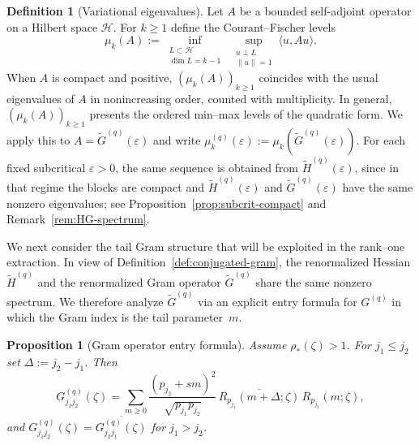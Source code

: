 \documentclass[11pt]{amsart}
\numberwithin{equation}{section}
\theoremstyle{plain}
\newtheorem{proposition}[theorem]{Proposition}
\theoremstyle{definition}
\newtheorem{definition}[theorem]{Definition}
\theoremstyle{remark}
\begin{document}
\begin{definition}[Variational eigenvalues]\label{def:variational-eigs}
	Let $A$ be a bounded self-adjoint operator on a Hilbert space $\mathcal H$.
	For $k\ge1$ define the Courant--Fischer levels
	\[
		\mu_k(A)
		:=\inf_{\substack{L\subset \mathcal H\\ \dim L=k-1}}\
		\sup_{\substack{u\perp L\\ \|u\|=1}}
		\langle u,Au\rangle.
	\]
	When $A$ is compact and positive, $(\mu_k(A))_{k\ge1}$ coincides with
	the usual eigenvalues of $A$ in nonincreasing order, counted with
	multiplicity. In general, $(\mu_k(A))_{k\ge1}$ presents the ordered
	min--max levels of the quadratic form.
	We apply this to $A=\widetilde G^{(q)}(\varepsilon)$ and write
	$\mu_k^{(q)}(\varepsilon):=\mu_k(\widetilde G^{(q)}(\varepsilon))$.
	For each fixed subcritical $\varepsilon>0$, the same sequence is obtained
	from $\widetilde H^{(q)}(\varepsilon)$, since in that regime the blocks are
	compact and $\widetilde H^{(q)}(\varepsilon)$ and
	$\widetilde G^{(q)}(\varepsilon)$ have the same nonzero eigenvalues; see
	Proposition~\ref{prop:subcrit-compact} and Remark~\ref{rem:HG-spectrum}.
\end{definition}

We next consider the tail Gram structure that will be exploited in the
rank--one extraction.
In view of Definition~\ref{def:conjugated-gram}, the renormalized Hessian
$\widetilde H^{(q)}$ and the renormalized Gram operator $\widetilde G^{(q)}$
share the same nonzero spectrum.  We therefore analyze $\widetilde G^{(q)}$
via an explicit entry formula for $G^{(q)}$ in which the Gram index is the
tail parameter~$m$.

\begin{proposition}[Gram operator entry formula]
	\label{prop:analytic-gram}
	Assume $\rho_*(\zeta)>1$. For $j_1\le j_2$ set $\Delta:=j_2-j_1$. Then
	\begin{equation}\label{eq:gram-entry}
		G^{(q)}_{j_1j_2}(\zeta)
		=
		\sum_{m\ge0}
		\frac{(p_{j_2}+sm)^2}{\sqrt{p_{j_1}p_{j_2}}}\,
		\overline{R_{p_{j_1}}(m+\Delta;\zeta)}\,R_{p_{j_2}}(m;\zeta),
	\end{equation}
	and $G^{(q)}_{j_1j_2}(\zeta)
		=\overline{G^{(q)}_{j_2j_1}(\zeta)}$ for $j_1>j_2$.
\end{proposition}
\end{document}
